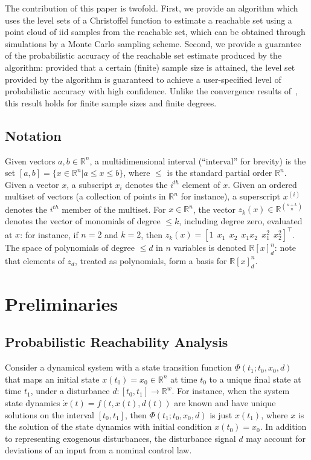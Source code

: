 \documentclass[letterpaper, 10 pt, conference]{ieeeconf}
\newcommand{\R}{\mathbb{R}}
\begin{document}
The contribution of this paper is twofold. First, we provide an algorithm which
uses the level sets of a Christoffel function to estimate a reachable set using
a point cloud of iid samples from the reachable set, which can be obtained
through simulations by a 
%
Monte Carlo sampling scheme. 
Second, we provide a guarantee of the probabilistic accuracy of the reachable
set estimate produced by the algorithm: provided that a certain (finite) sample
size is attained, the level set provided by the algorithm is guaranteed to
achieve a user-specified level of probabilistic accuracy with high confidence.
Unlike the convergence results of~\cite{lasserre2019empirical,pauwels2020data}, this result holds for finite sample sizes and finite degrees.

\subsection*{Notation}

Given vectors $a,b\in\R^n$, a multidimensional interval (``interval'' for
brevity) is the set $[a,b]=\{x\in\R^n | a \le x \le b\}$, where $\le$ is the
standard partial order $\R^n$.
%
Given a vector $x$, a subscript $x_i$ denotes the $i^{th}$ element of $x$. Given
an ordered multiset of vectors (a collection of points in $\R^n$ for instance), a superscript $x^{(i)}$
denotes the $i^{th}$ member of the multiset.
For $x\in\R^n$, the vector $z_k(x)\in\R^{\binom{n+k}{n}}$ denotes the vector of monomials of degree $\le k$, including degree zero, evaluated at $x$: for instance, if $n=2$ and $k=2$, then $z_k(x)=[1~~x_1~~x_2~~x_1x_2~~x_1^2~~x_2^2]^\top$.
The space of polynomials of degree $\le d$ in $n$ variables is denoted $\R[x]^n_d$: note that elements of $z_d$, treated as polynomials, form a basis for $\R[x]^n_d$.

\section{Preliminaries}

\subsection{Probabilistic Reachability Analysis}
\label{subsec:probabilistic_reachability_analysis}

Consider a 
%
dynamical system with a state transition function
$\Phi(t_1;t_0, x_0, d)$
that maps an initial state $x(t_0)=x_0\in\R^n$ at time $t_0$ to a unique final state
at time $t_1$, under 
%
a disturbance $d:[t_0,t_1]\to\R^{w}$. 
For instance, when the system state dynamics $ \dot{x}(t) = f(t,x(t),d(t))$
are known and have unique solutions on the interval $[t_0,t_1]$, then
$\Phi(t_1;t_0, x_0, d)$ is just $x(t_1)$, where $x$ is the solution of the state dynamics with initial condition $x(t_0)=x_0$.
In addition to representing exogenous disturbances, the disturbance signal $d$
may account for deviations of an input from a nominal control law.
\end{document}

